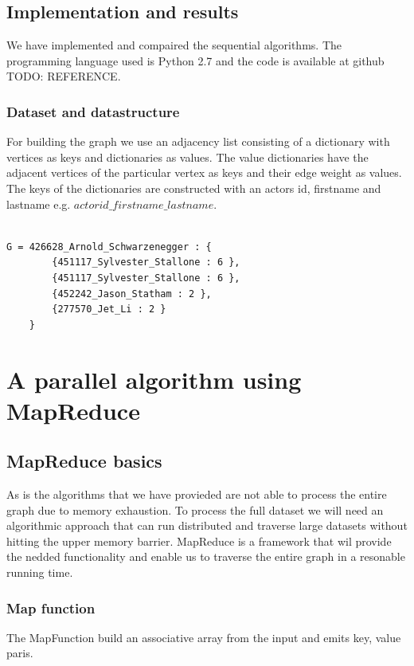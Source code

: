 \documentclass{article}
\begin{document}
\subsection{Implementation and results}
We have implemented and compaired the sequential algorithms. The programming language used is Python 2.7 and the code is available at github TODO: REFERENCE.

\subsubsection{Dataset and datastructure}
For building the graph we use an adjacency list consisting of a dictionary with vertices as keys and dictionaries as values. The value dictionaries have the adjacent vertices of the particular vertex as keys and their edge weight as values. The keys of the dictionaries are constructed with an actors id, firstname and lastname e.g. $actorid\_firstname\_lastname$.

\begin{lstlisting}

G = 426628_Arnold_Schwarzenegger : {
 		{451117_Sylvester_Stallone : 6 },
 		{451117_Sylvester_Stallone : 6 },
 		{452242_Jason_Statham : 2 },
 		{277570_Jet_Li : 2 }
 	}

 \end{lstlisting}

\section{A parallel algorithm using MapReduce}

\subsection{MapReduce basics}
As is the algorithms that we have provieded are not able to process the entire graph due to memory exhaustion. To process the full dataset we will need an algorithmic approach that can run distributed and traverse large datasets without hitting the upper memory barrier. MapReduce is a framework that wil provide the nedded functionality and enable us to traverse the entire graph in a resonable running time.

\subsubsection{Map function}
The MapFunction build an associative array from the input and emits key, value paris.
\end{document}
